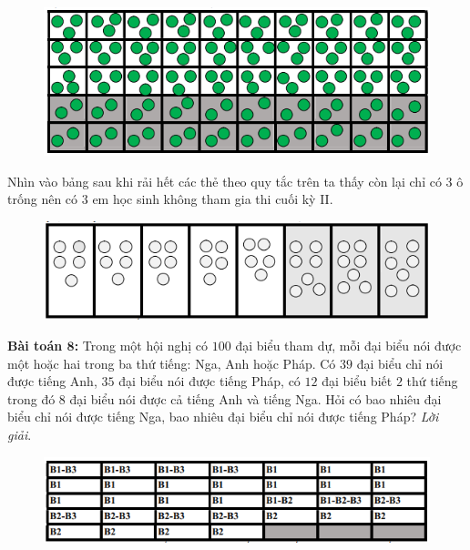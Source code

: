 \begin{multicols}{2}
	\begin{figure}[H]
		\vspace*{-5pt}
		\centering
		\captionsetup{labelformat= empty, justification=centering}
		\includegraphics[width= 1\linewidth]{6}
		\vspace*{-15pt}
	\end{figure}	
	Nhìn vào bảng sau khi rải hết các thẻ theo quy tắc trên ta thấy còn lại chỉ có $3$ ô trống nên có $3$ em học sinh không tham gia thi cuối kỳ II.
	\begin{figure}[H]
		\vspace*{-5pt}
		\centering
		\captionsetup{labelformat= empty, justification=centering}
		\includegraphics[width= 1\linewidth]{7}
		\vspace*{-15pt}
	\end{figure}
	\textbf{\color{toancuabi}Bài toán $\pmb8$:} 
	\vskip 0.1cm
	Trong một hội nghị có $100$ đại biểu tham dự, mỗi đại biểu nói được một hoặc hai trong ba thứ tiếng: Nga, Anh hoặc Pháp. Có $39$ đại biểu chỉ nói được tiếng Anh, $35$ đại biểu nói được tiếng Pháp, có $12$ đại biểu biết $2$ thứ tiếng trong đó $8$ đại biểu nói được cả tiếng Anh và tiếng Nga. Hỏi có bao nhiêu đại biểu chỉ nói được tiếng Nga, bao nhiêu đại biểu chỉ nói được tiếng Pháp?
	\vskip 0.1cm
	\textit{Lời giải}.
	\begin{figure}[H]
		\vspace*{-5pt}
		\centering
		\captionsetup{labelformat= empty, justification=centering}
		\includegraphics[width= 1\linewidth]{8}

\end{figure}
\end{multicols}

